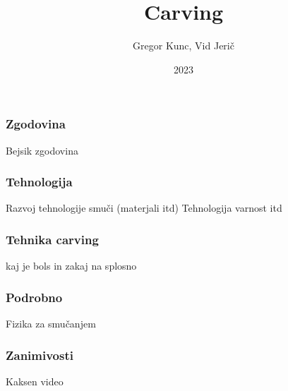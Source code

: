 \documentclass{beamer}
\title{Carving}
\author{Gregor Kunc, Vid Jerič}
\date{2023}
\begin{document}
\frame{\titlepage}

\begin{frame}
\frametitle{Zgodovina}
Bejsik zgodovina
\end{frame}

\begin{frame}
    \frametitle{Tehnologija}
    Razvoj tehnologije smuči (materjali itd) Tehnologija varnost itd
\end{frame}

\begin{frame}
    \frametitle{Tehnika carving}
    kaj je bols in zakaj na splosno
\end{frame}

\begin{frame}
    \frametitle{Podrobno}
    Fizika za smučanjem
\end{frame}

\begin{frame}
    \frametitle{Zanimivosti}
    Kaksen video
\end{frame}
\end{document}
